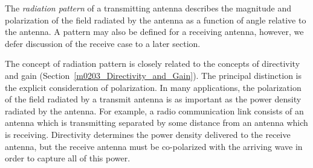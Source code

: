 

\label{m0205_Radiation_Pattern} %

The \emph{radiation pattern} of a transmitting antenna describes the magnitude and polarization of the field radiated by the antenna as a function of angle relative to the antenna.  A pattern may also be defined for a receiving antenna, however, we defer discussion of the receive case to a later section. 

The concept of radiation pattern is closely related to the concepts of directivity and gain (Section~\ref{m0203_Directivity_and_Gain}). 
The principal distinction is the explicit consideration of polarization.
In many applications, the polarization of the field radiated by a transmit antenna is as important as the power density radiated by the antenna.
For example, a radio communication link consists of an antenna which is transmitting separated by some distance from an antenna which is receiving.  
Directivity determines the power density delivered to the receive antenna, but the receive antenna must be co-polarized with the arriving wave in order to capture all of this power.  

